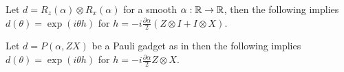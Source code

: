 \begin{example}
Let $d = R_z(\alpha) \otimes R_x(\alpha)$ for a smooth $\alpha : \mathbb{R} \to \mathbb{R}$, then the following implies $d(\theta) = \exp(i \theta h)$ for $h = - i \frac{\partial \alpha}{2}(Z \otimes I + I \otimes X)$.
\end{example}

\begin{example}
Let $d = P(\alpha, ZX)$ be a Pauli gadget as in \cite[Definition~4.1]{CowtanEtAl20a} then
the following implies
$d(\theta) = \exp(i \theta h)$ for $h = -i \frac{\partial \alpha}{2} Z \otimes X$.
\end{example}
